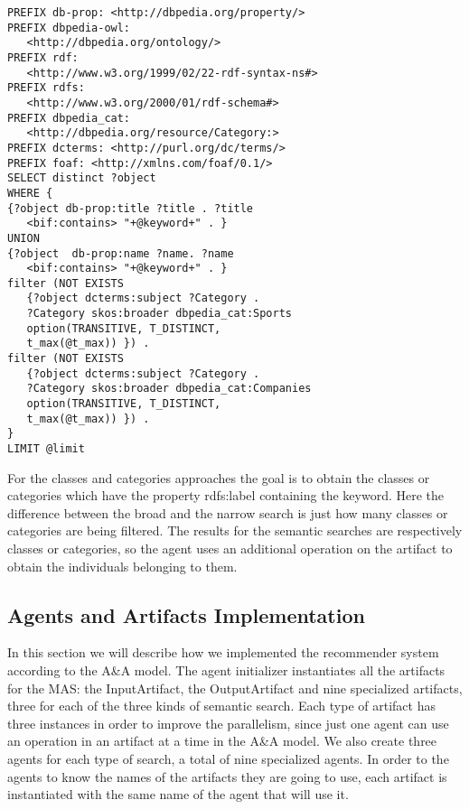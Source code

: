 \documentclass[a4paper,twoside]{article}
\begin{document}
\begin{small}
\begin{verbatim}
PREFIX db-prop: <http://dbpedia.org/property/>
PREFIX dbpedia-owl:
   <http://dbpedia.org/ontology/>
PREFIX rdf:
   <http://www.w3.org/1999/02/22-rdf-syntax-ns#>
PREFIX rdfs:
   <http://www.w3.org/2000/01/rdf-schema#>
PREFIX dbpedia_cat:
   <http://dbpedia.org/resource/Category:>
PREFIX dcterms: <http://purl.org/dc/terms/>
PREFIX foaf: <http://xmlns.com/foaf/0.1/>
SELECT distinct ?object
WHERE {
{?object db-prop:title ?title . ?title
   <bif:contains> "+@keyword+" . }
UNION 
{?object  db-prop:name ?name. ?name
   <bif:contains> "+@keyword+" . }
filter (NOT EXISTS
   {?object dcterms:subject ?Category .
   ?Category skos:broader dbpedia_cat:Sports
   option(TRANSITIVE, T_DISTINCT,
   t_max(@t_max)) }) .
filter (NOT EXISTS
   {?object dcterms:subject ?Category .
   ?Category skos:broader dbpedia_cat:Companies
   option(TRANSITIVE, T_DISTINCT,
   t_max(@t_max)) }) .
}
LIMIT @limit
\end{verbatim}
\end{small}

For the classes and categories approaches the goal is to obtain the classes or categories which have the property rdfs:label containing the keyword. Here the difference between the broad and the narrow search is just how many classes or categories are being filtered. The results for the semantic searches are respectively classes or categories, so the agent uses an additional operation on the artifact to obtain the individuals belonging to them.

\subsection{Agents and Artifacts Implementation}
\label{sec:aeaimpl}

\noindent In this section we will describe how we implemented the recommender system according to the A\&A model. The agent initializer instantiates all the artifacts for the MAS: the InputArtifact, the OutputArtifact and nine specialized artifacts, three for each of the three kinds of semantic search. Each type of artifact has three instances in order to improve the parallelism, since just one agent can use an operation in an artifact at a time in the A\&A model. We also create three agents for each type of search, a total of nine specialized agents. In order to the agents to know the names of the artifacts they are going to use, each artifact is instantiated with the same name of the agent that will use it.
\end{document}
